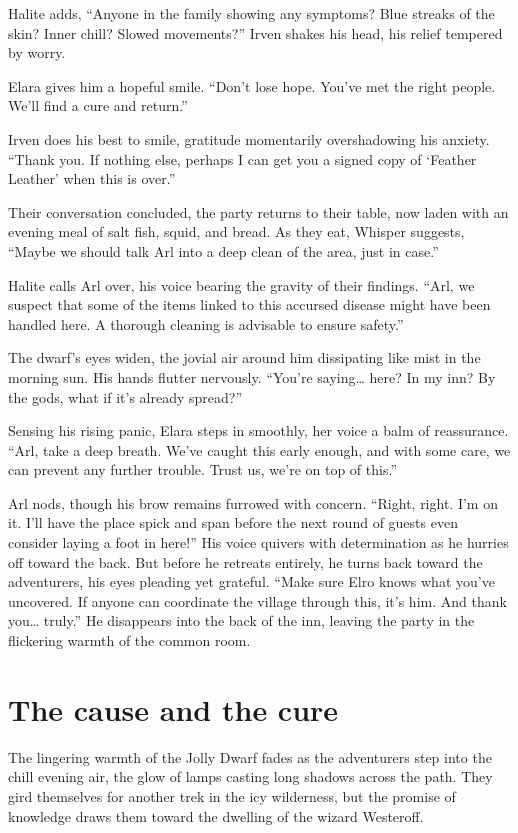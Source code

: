 \documentclass[
  letterpaper,12pt,twoside,twocolumn,openany,
  nodeprecatedcode,bg=full]{dndbook}
\begin{document}
Halite adds, ``Anyone in the family showing any symptoms? Blue streaks
of the skin? Inner chill? Slowed movements?'' Irven shakes his head, his
relief tempered by worry.

Elara gives him a hopeful smile. ``Don't lose hope. You've met the right
people. We'll find a cure and return.''

Irven does his best to smile, gratitude momentarily overshadowing his
anxiety. ``Thank you. If nothing else, perhaps I can get you a signed
copy of `Feather Leather' when this is over.''

Their conversation concluded, the party returns to their table, now
laden with an evening meal of salt fish, squid, and bread. As they eat,
Whisper suggests, ``Maybe we should talk Arl into a deep clean of the
area, just in case.''

Halite calls Arl over, his voice bearing the gravity of their findings.
``Arl, we suspect that some of the items linked to this accursed disease
might have been handled here. A thorough cleaning is advisable to ensure
safety.''

The dwarf's eyes widen, the jovial air around him dissipating like mist
in the morning sun. His hands flutter nervously. ``You're saying\ldots{}
here? In my inn? By the gods, what if it's already spread?''

Sensing his rising panic, Elara steps in smoothly, her voice a balm of
reassurance. ``Arl, take a deep breath. We've caught this early enough,
and with some care, we can prevent any further trouble. Trust us, we're
on top of this.''

Arl nods, though his brow remains furrowed with concern. ``Right, right.
I'm on it. I'll have the place spick and span before the next round of
guests even consider laying a foot in here!'' His voice quivers with
determination as he hurries off toward the back. But before he retreats
entirely, he turns back toward the adventurers, his eyes pleading yet
grateful. ``Make sure Elro knows what you've uncovered. If anyone can
coordinate the village through this, it's him. And thank you\ldots{}
truly.'' He disappears into the back of the inn, leaving the party in
the flickering warmth of the common room.

\section{The cause and the cure}\label{the-cause-and-the-cure}

The lingering warmth of the Jolly Dwarf fades as the adventurers step
into the chill evening air, the glow of lamps casting long shadows
across the path. They gird themselves for another trek in the icy
wilderness, but the promise of knowledge draws them toward the dwelling
of the wizard Westeroff.
\end{document}

